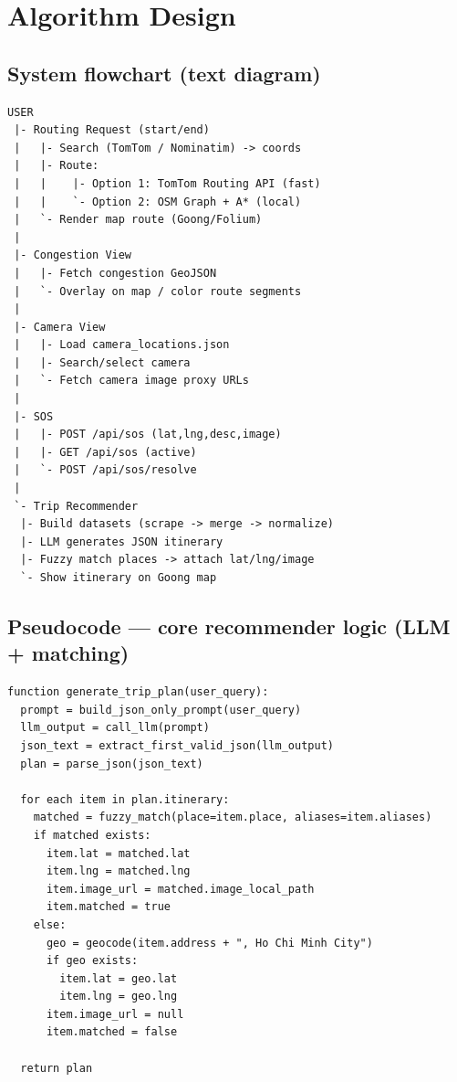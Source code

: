 \section{Algorithm Design}

\subsection{System flowchart (text diagram)}
\begin{verbatim}
USER
 |- Routing Request (start/end)
 |   |- Search (TomTom / Nominatim) -> coords
 |   |- Route:
 |   |    |- Option 1: TomTom Routing API (fast)
 |   |    `- Option 2: OSM Graph + A* (local)
 |   `- Render map route (Goong/Folium)
 |
 |- Congestion View
 |   |- Fetch congestion GeoJSON
 |   `- Overlay on map / color route segments
 |
 |- Camera View
 |   |- Load camera_locations.json
 |   |- Search/select camera
 |   `- Fetch camera image proxy URLs
 |
 |- SOS
 |   |- POST /api/sos (lat,lng,desc,image)
 |   |- GET /api/sos (active)
 |   `- POST /api/sos/resolve
 |
 `- Trip Recommender
  |- Build datasets (scrape -> merge -> normalize)
  |- LLM generates JSON itinerary
  |- Fuzzy match places -> attach lat/lng/image
  `- Show itinerary on Goong map
\end{verbatim}

\subsection{Pseudocode --- core recommender logic (LLM + matching)}
\begin{verbatim}
function generate_trip_plan(user_query):
  prompt = build_json_only_prompt(user_query)
  llm_output = call_llm(prompt)
  json_text = extract_first_valid_json(llm_output)
  plan = parse_json(json_text)

  for each item in plan.itinerary:
    matched = fuzzy_match(place=item.place, aliases=item.aliases)
    if matched exists:
      item.lat = matched.lat
      item.lng = matched.lng
      item.image_url = matched.image_local_path
      item.matched = true
    else:
      geo = geocode(item.address + ", Ho Chi Minh City")
      if geo exists:
        item.lat = geo.lat
        item.lng = geo.lng
      item.image_url = null
      item.matched = false

  return plan
\end{verbatim}

